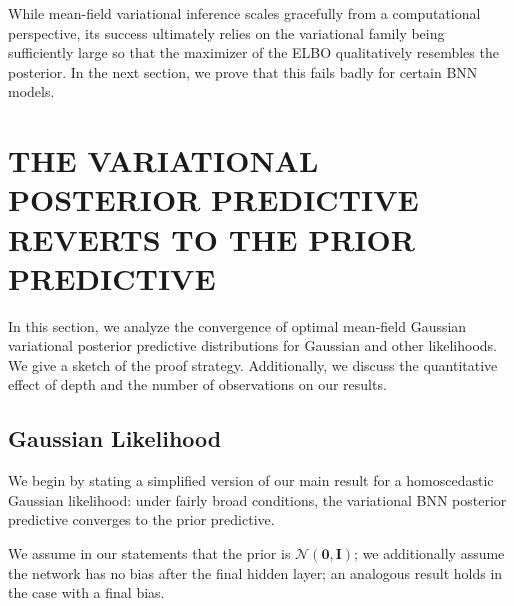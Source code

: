 \documentclass[twoside]{article}
\newcommand{\mI}{\mathbf{I}}
\newcommand{\Normal}{\mathcal{N}}
\theoremstyle{theoremstyle}
\begin{document}
While mean-field variational inference scales gracefully from a computational perspective, its success ultimately relies on the variational family being sufficiently large so that the maximizer of the ELBO qualitatively resembles the posterior. In the next section, we prove that this fails badly for certain BNN models.

\section{THE VARIATIONAL POSTERIOR PREDICTIVE REVERTS TO THE PRIOR PREDICTIVE}\label{sec:main_analysis}

In this section, we analyze the convergence of optimal mean-field Gaussian variational posterior predictive distributions for Gaussian and other likelihoods. We give a sketch of the proof strategy. Additionally, we discuss the quantitative effect of depth and the number of observations on our results.  

\subsection{Gaussian Likelihood}

We begin by stating a simplified version of our main result for a homoscedastic Gaussian likelihood: under fairly broad conditions, the variational BNN posterior predictive converges to the prior predictive.

We assume in our statements that the prior is $\Normal(\mathbf{0}, \mI)$; we additionally assume the network has no bias after the final hidden layer; an analogous result holds in the case with a final bias.
 
\end{document}
